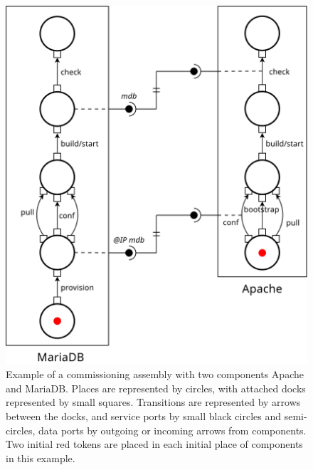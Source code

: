 \begin{figure}[tbp]
  \begin{center}
    \includegraphics[width=0.7\linewidth]{./images/apachebdd.pdf}
  \end{center}
  \caption{Example of a \mad commissioning assembly with two components
    Apache and MariaDB. Places are represented by circles, with attached
    docks represented by small squares. Transitions are represented
    by arrows between the docks, and service ports by small black circles and
    semi-circles, data ports by outgoing or incoming arrows from
    components. Two initial red tokens are placed in each initial
    place of components in this example.}
  \label{fig:example}
\end{figure}

